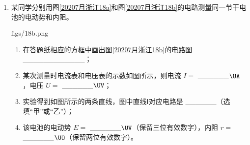 \documentclass[\gkver]{gaokaozhenti}
\begin{document}
\begin{enumerate}
{②单摆的周期 $T=2\pi\sqrt{\frac{l}{g}}$，即 $T^{2}=\frac{4\pi^{2}}{g}\cdot l$。但是实验所得 $T^{2}-l$ 没过原点，测得重力加速度与当地结果相符，则斜率仍为 $\frac{4\pi^{2}}{g}$；则 $T^{2}=\frac{4\pi^{2}}{g}\cdot(l+l_{0})$，故实验可能是测量时直接将摆线的长度作为摆长了。
}

\item
某同学分别用图\ref{20207月浙江18a}和图\ref{20207月浙江18b}的电路测量同一节干电池的电动势和内阻。

{figs/18b.png}

\begin{enumerate}
	\item
	在答题纸相应的方框中画出图\ref{20207月浙江18b}的电路图 \_\_\_\_\_\_\_\_\_\_\_\_；

	\item
	某次测量时电流表和电压表的示数如图所示，则电流 $I=$ \_\_\_\_\_\_$\UA$，电压 $U=$ \_\_\_\_\_\_$\UV$；


	\item
	实验得到如图所示的两条直线，图中直线Ⅰ对应电路是 \_\_\_\_\_\_（选填“甲”或“乙”）；


	\item
	该电池的电动势 $E=$ \_\_\_\_\_\_$\UV$（保留三位有效数字），内阻 $r=$ \_\_\_\_\_\_$\UO$（保留两位有效数字）。
\end{enumerate}
\end{enumerate}
\end{document}
